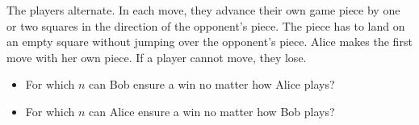 \documentclass[11pt,letterpaper]{article}
\begin{document}
\begin{enumerate}[resume]
\begin{center}
    \end{center}
    The players alternate. In each move, they advance their own game piece by one or two squares in the direction of the opponent's piece. The piece has to land on an empty square without jumping over the opponent's piece. Alice makes the first move with her own piece. If a player cannot move, they lose.
    \begin{itemize}
        \item For which $n$ can Bob ensure a win no matter how Alice plays?
        \item For which $n$ can Alice ensure a win no matter how Bob plays?
    \end{itemize}
\end{enumerate}
\end{document}
